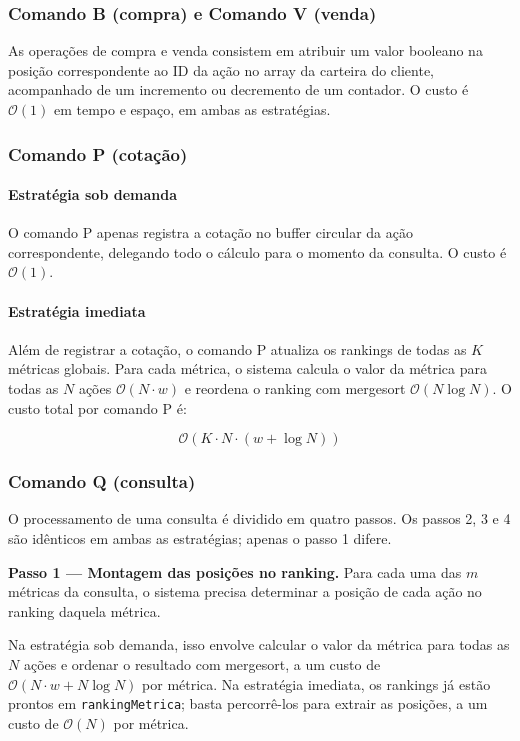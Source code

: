 \documentclass[12pt,a4paper]{article}
\begin{document}
\subsubsection*{Comando B (compra) e Comando V (venda)}

As operações de compra e venda consistem em atribuir um valor booleano na posição correspondente ao ID da ação no array da carteira do cliente, acompanhado de um incremento ou decremento de um contador. O custo é $\mathcal{O}(1)$ em tempo e espaço, em ambas as estratégias.

\subsubsection*{Comando P (cotação)}

\paragraph*{Estratégia sob demanda}
O comando P apenas registra a cotação no buffer circular da ação correspondente, delegando todo o cálculo para o momento da consulta. O custo é $\mathcal{O}(1)$.

\paragraph*{Estratégia imediata}
Além de registrar a cotação, o comando P atualiza os rankings de todas as $K$ métricas globais. Para cada métrica, o sistema calcula o valor da métrica para todas as $N$ ações $\mathcal{O}(N \cdot w)$ e reordena o ranking com mergesort $\mathcal{O}(N \log N)$. O custo total por comando P é:

$$ \mathcal{O}(K \cdot N \cdot (w + \log N)) $$

\subsubsection*{Comando Q (consulta)}

O processamento de uma consulta é dividido em quatro passos. Os passos 2, 3 e 4 são idênticos em ambas as estratégias; apenas o passo 1 difere.

\textbf{Passo 1 --- Montagem das posições no ranking.} Para cada uma das $m$ métricas da consulta, o sistema precisa determinar a posição de cada ação no ranking daquela métrica.

Na estratégia sob demanda, isso envolve calcular o valor da métrica para todas as $N$ ações e ordenar o resultado com mergesort, a um custo de $\mathcal{O}(N \cdot w + N \log N)$ por métrica. Na estratégia imediata, os rankings já estão prontos em \texttt{rankingMetrica}; basta percorrê-los para extrair as posições, a um custo de $\mathcal{O}(N)$ por métrica.
\end{document}
